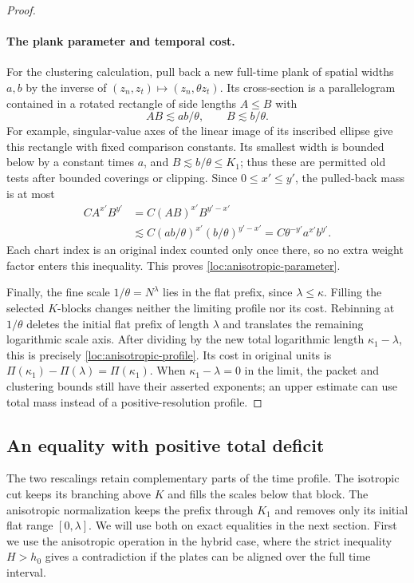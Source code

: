 \begin{proof}
\paragraph{The plank parameter and temporal cost.}
For the clustering calculation, pull back a new full-time plank of
spatial widths $a,b$ by the inverse of
$(z_n,z_t)\mapsto(z_n,\theta z_t)$.  Its cross-section is a
parallelogram contained in a rotated rectangle of side lengths
$A\leq B$ with
\[
 AB\lesssim ab/\theta,\qquad B\lesssim b/\theta.
\]
For example, singular-value axes of the linear image of its
inscribed ellipse give this rectangle with fixed comparison
constants.  Its smallest width is bounded below by a constant
times $a$, and $B\lesssim b/\theta\leq K_1$; thus these are
permitted old tests after bounded coverings or clipping.  Since
$0\leq x'\leq y'$, the pulled-back mass is at most
\begin{align*}
 C A^{x'}B^{y'}
 &=C(AB)^{x'}B^{y'-x'}\\
 &\lesssim C(ab/\theta)^{x'}(b/\theta)^{y'-x'}
   =C\theta^{-y'}a^{x'}b^{y'}.
\end{align*}
Each chart index is an original index counted only once there,
so no extra weight factor enters this inequality.  This proves
\eqref{loc:anisotropic-parameter}.

Finally, the fine scale $1/\theta=N^\lambda$ lies in the flat
prefix, since $\lambda\leq\kappa$.  Filling the selected
$K$-blocks changes neither the limiting profile nor its cost.
Rebinning at $1/\theta$ deletes the initial flat prefix of length
$\lambda$ and translates the remaining logarithmic scale axis.
After dividing by the new total logarithmic length
$\kappa_1-\lambda$, this is precisely
\eqref{loc:anisotropic-profile}.  Its cost in original units is
$\Pi(\kappa_1)-\Pi(\lambda)=\Pi(\kappa_1)$.
When $\kappa_1-\lambda=0$ in the limit, the packet and clustering
bounds still have their asserted exponents; an upper estimate
can use total mass instead of a positive-resolution profile.
\end{proof}

\subsection{An equality with positive total deficit}

The two rescalings retain complementary parts of the time profile.
The isotropic cut keeps its branching above $K$ and fills the scales
below that block.  The anisotropic normalization keeps the prefix
through $K_1$ and removes only its initial flat range
$[0,\lambda]$.  We will use both on exact equalities in the next
section.  First we use the anisotropic operation in the hybrid case,
where the strict inequality $H>h_0$ gives a contradiction if the
plates can be aligned over the full time interval.

